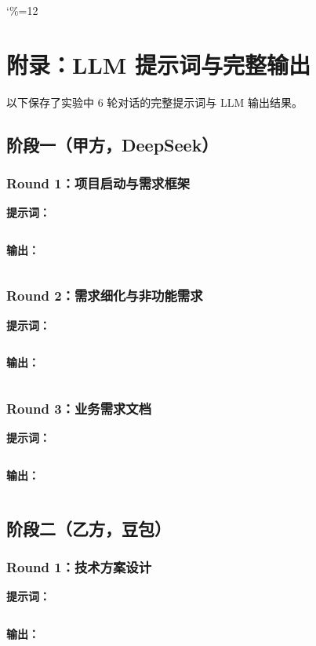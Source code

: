 \documentclass[12pt, a4paper]{academics}
\begin{document}
\appendix
\catcode`\%=12
\section{附录：LLM 提示词与完整输出}

以下保存了实验中 6 轮对话的完整提示词与 LLM 输出结果。

\subsection{阶段一（甲方，DeepSeek）}

\subsubsection{Round 1：项目启动与需求框架}

\textbf{提示词：}
\inputminted[]{text}{../res/phase1-round1-prompt.md}

\textbf{输出：}
\inputminted[]{text}{../res/phase1-round1-output.md}

\subsubsection{Round 2：需求细化与非功能需求}

\textbf{提示词：}
\inputminted[]{text}{../res/phase1-round2-prompt.md}

\textbf{输出：}
\inputminted[]{text}{../res/phase1-round2-output.md}

\subsubsection{Round 3：业务需求文档}

\textbf{提示词：}
\inputminted[]{text}{../res/phase1-round3-prompt.md}

\textbf{输出：}
\inputminted[]{text}{../res/phase1-round3-output.md}

\subsection{阶段二（乙方，豆包）}

\subsubsection{Round 1：技术方案设计}

\textbf{提示词：}
\inputminted[]{text}{../res/phase2-round1-prompt.md}

\textbf{输出：}
\inputminted[]{text}{../res/phase2-round1-output.md}
\end{document}
